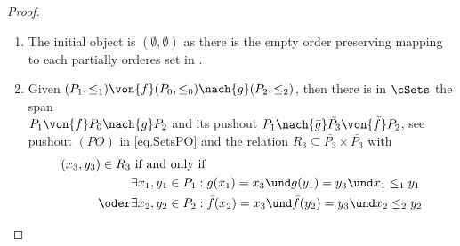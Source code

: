 \begin{proof}
\begin{enumerate}
	\item The initial object is $(\emptyset,\emptyset)$ as there is the empty order preserving 
	mapping to each partially orderes set in \cPosets.
	
	\item Given $(P_1,\le_1) \von{f} (P_0,\le_0) \nach{g} (P_2,\le_2)$, then 
	there is in $\cSets$ the span\\
	       $P_1\von{f} P_0 \nach{g} P_2$ and its pushout $P_1 \nach{\bar{g}} \bar{P_3} \von{\bar{f}} P_2$, see pushout $(PO)$ in \ref{eq.SetsPO}				
				 and the relation $R_3 \subseteq \bar{P_3} \times \bar{P_3} $ with 
				\begin{equation}
	         \label{eq.R3}
		       \begin{aligned}
					    (x_3,y_3) \in R_3 &\textrm{ if and only if } \\
					                      & \exists x_1,y_1 \in P_1: \bar{g}(x_1) =x_3 \und \bar{g}(y_1) =y_3 
																                                             \und x_1 \le_1 y_1 \\
					               \oder  & \exists x_2,y_2 \in P_2: \bar{f}(x_2) =x_3 \und \bar{f}(y_2) =y_3 
																                                             \und x_2 \le_2 y_2
				   \end{aligned}
         \end{equation}
				

\end{enumerate}
\end{proof}
